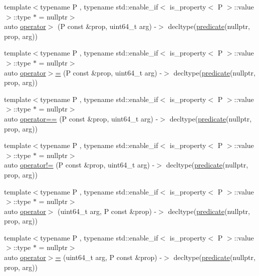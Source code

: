 \begin{DoxyCompactItemize}
{\footnotesize template$<$typename P , typename std\+::enable\+\_\+if$<$ is\+\_\+property$<$ P $>$\+::value $>$\+::type $\ast$  = nullptr$>$ }\\auto \hyperlink{namespacepfq_1_1lang_a708ca1f29e8dd2461859c46369e89322}{operator$>$} (P const \&prop, uint64\+\_\+t arg) -\/$>$ decltype(\hyperlink{namespacepfq_1_1lang_aca9adafc436b7f851621b979fa1aaf88}{predicate}(nullptr, prop, arg))
\item 
{\footnotesize template$<$typename P , typename std\+::enable\+\_\+if$<$ is\+\_\+property$<$ P $>$\+::value $>$\+::type $\ast$  = nullptr$>$ }\\auto \hyperlink{namespacepfq_1_1lang_a8278e1cf39622e9eb4859f4720da1d16}{operator$>$=} (P const \&prop, uint64\+\_\+t arg) -\/$>$ decltype(\hyperlink{namespacepfq_1_1lang_aca9adafc436b7f851621b979fa1aaf88}{predicate}(nullptr, prop, arg))
\item 
{\footnotesize template$<$typename P , typename std\+::enable\+\_\+if$<$ is\+\_\+property$<$ P $>$\+::value $>$\+::type $\ast$  = nullptr$>$ }\\auto \hyperlink{namespacepfq_1_1lang_a87c8fa322873efdbddaa437f194b72b0}{operator==} (P const \&prop, uint64\+\_\+t arg) -\/$>$ decltype(\hyperlink{namespacepfq_1_1lang_aca9adafc436b7f851621b979fa1aaf88}{predicate}(nullptr, prop, arg))
\item 
{\footnotesize template$<$typename P , typename std\+::enable\+\_\+if$<$ is\+\_\+property$<$ P $>$\+::value $>$\+::type $\ast$  = nullptr$>$ }\\auto \hyperlink{namespacepfq_1_1lang_a4943eabefcfed4198394f42f913a14e8}{operator!=} (P const \&prop, uint64\+\_\+t arg) -\/$>$ decltype(\hyperlink{namespacepfq_1_1lang_aca9adafc436b7f851621b979fa1aaf88}{predicate}(nullptr, prop, arg))
\item 
{\footnotesize template$<$typename P , typename std\+::enable\+\_\+if$<$ is\+\_\+property$<$ P $>$\+::value $>$\+::type $\ast$  = nullptr$>$ }\\auto \hyperlink{namespacepfq_1_1lang_a2217aa601457dcb21231ae59fe2bb8a2}{operator$>$} (uint64\+\_\+t arg, P const \&prop) -\/$>$ decltype(\hyperlink{namespacepfq_1_1lang_aca9adafc436b7f851621b979fa1aaf88}{predicate}(nullptr, prop, arg))
\item 
{\footnotesize template$<$typename P , typename std\+::enable\+\_\+if$<$ is\+\_\+property$<$ P $>$\+::value $>$\+::type $\ast$  = nullptr$>$ }\\auto \hyperlink{namespacepfq_1_1lang_a8a51f8f94279b3b4c7c3e2b52a89470c}{operator$>$=} (uint64\+\_\+t arg, P const \&prop) -\/$>$ decltype(\hyperlink{namespacepfq_1_1lang_aca9adafc436b7f851621b979fa1aaf88}{predicate}(nullptr, prop, arg))

\end{DoxyCompactItemize}

